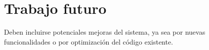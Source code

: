 \section{\forlnameref Trabajo futuro}
\label{sec:futureWork}

\begin{shaded}
Deben incluirse potenciales mejoras del sistema, ya sea por nuevas funcionalidades o por optimización del código existente.
\end{shaded}